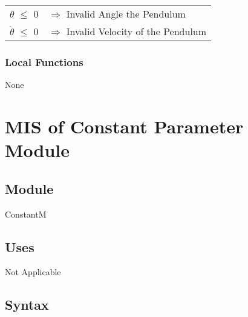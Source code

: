 \documentclass[12pt, titlepage]{article}
\begin{document}
\noindent
\begin{longtable*}[l]{l l} 
 $\theta$ $\leq$ $0$ & $\Rightarrow$ Invalid Angle the Pendulum\\

$\dot{\theta}$ $\leq$ $0$ & $\Rightarrow$ Invalid Velocity of the Pendulum\\
\end{longtable*}


\subsubsection{Local Functions}
None



\newpage
\section{MIS of Constant Parameter Module \label{MConstant}} 


\subsection{Module}

ConstantM

\subsection{Uses}

Not Applicable
\subsection{Syntax}
\end{document}
